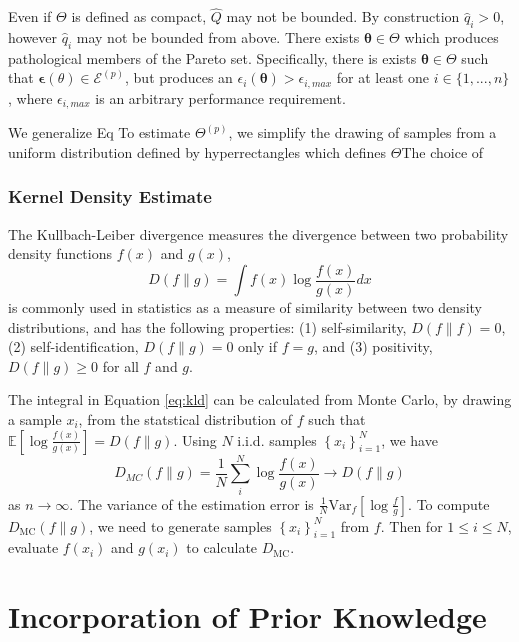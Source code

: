 Even if $\Theta$ is defined as compact, $\hat{Q}$ may not be bounded.  By construction $\hat{q}_i > 0 $, however $\hat{q}_i$ may not be bounded from above.  There exists $\bm{\theta} \in \Theta$ which produces pathological members of the Pareto set.  Specifically, there is exists $\bm{\theta} \in \Theta$ such that $\bm{\epsilon}(\theta) \in \mathcal{E}^(p)$, but produces an $\epsilon_i(\bm{\theta}) > \epsilon_{i,max}$ for at least one $i\in\{1,...,n\}$, where $\epsilon_{i,max}$ is an arbitrary performance requirement.

We generalize Eq
To estimate $\Theta^{(p)}$, we simplify the drawing of samples from a uniform distribution defined by hyperrectangles which defines $\Theta$The choice of
\subsubsection{Kernel Density Estimate}

The Kullbach-Leiber divergence\cite{kullback1951_kld} measures the divergence between two probability density functions $f(x)$ and $g(x)$,
\begin{equation}\label{eq:kld}
   D(f \parallel g) = \int f(x) \log \frac{f(x)}
                                          {g(x)} dx
\end{equation}
is commonly used in statistics as a measure of similarity between two density distributions, and has the following properties: (1) self-similarity, $D(f \parallel f) = 0$, (2) self-identification, $D(f \parallel g) = 0$ only if $f=g$, and (3) positivity, $D(f \parallel g) \geq 0$ for all $f$ and $g$.

The integral in Equation \ref{eq:kld} can be calculated from Monte Carlo\cite{hershey2007_kld_approx}, by drawing a sample $x_i$, from the statstical distribution of $f$ such that $\mathbb{E}\left[\log\frac{f(x)}{g(x)}\right] = D(f \parallel g)$.  Using $N$ i.i.d. samples $\left\{x_i\right\}_{i=1}^N$, we have
\begin{equation}
  \label{eq:kdmc}
  D_{MC}(f \parallel g) = \frac{1}{N}\sum_i^N \log \frac{f(x)}{g(x)}
      \rightarrow D(f \parallel g)
\end{equation}
as $n \rightarrow \infty$.  The variance of the estimation error is $\frac{1}{N}\mathrm{Var}_f\left[\log\frac{f}{g}\right]$.  To compute $D_{\mathrm{MC}}(f \parallel g)$, we need to generate samples $\left\{x_i\right\}_{i=1}^N$ from $f$.  Then for $1 \leq i \leq N$, evaluate $f(x_i)$ and $g(x_i)$ to calculate $D_{\mathrm{MC}}$.
\section{Incorporation of Prior Knowledge}

